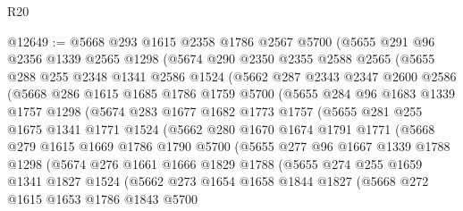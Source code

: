 \begin{lexlean}{R20}
\begin{coremodule}
@12649 := @5668
    @293
    @1615
    @2358
    @1786
    @2567
    @5700
    (@5655
      @291
      @96
      @2356
      @1339
      @2565
      @1298
      (@5674
        @290
        @2350
        @2355
        @2588
        @2565
        (@5655
          @288
          @255
          @2348
          @1341
          @2586
          @1524
          (@5662
            @287
            @2343
            @2347
            @2600
            @2586
            (@5668
              @286
              @1615
              @1685
              @1786
              @1759
              @5700
              (@5655
                @284
                @96
                @1683
                @1339
                @1757
                @1298
                (@5674
                  @283
                  @1677
                  @1682
                  @1773
                  @1757
                  (@5655
                    @281
                    @255
                    @1675
                    @1341
                    @1771
                    @1524
                    (@5662
                      @280
                      @1670
                      @1674
                      @1791
                      @1771
                      (@5668
                        @279
                        @1615
                        @1669
                        @1786
                        @1790
                        @5700
                        (@5655
                          @277
                          @96
                          @1667
                          @1339
                          @1788
                          @1298
                          (@5674
                            @276
                            @1661
                            @1666
                            @1829
                            @1788
                            (@5655
                              @274
                              @255
                              @1659
                              @1341
                              @1827
                              @1524
                              (@5662
                                @273
                                @1654
                                @1658
                                @1844
                                @1827
                                (@5668
                                  @272
                                  @1615
                                  @1653
                                  @1786
                                  @1843
                                  @5700

\end{coremodule}
\end{lexlean}
